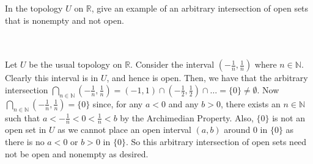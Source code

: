 In the topology $U$ on $\mathbb{R}$, give an example of an arbitrary intersection of open sets that is
nonempty and not open.\\\\

\begin{solution}\renewcommand{\qedsymbol}{}\ \\
    Let $U$ be the usual topology on $\mathbb{R}$. Consider the interval $(-\frac1n, \frac1n)$ where
    $n\in\mathbb{N}$. Clearly this interval is in $U$, and hence is open. Then, we have that the
    arbitrary intersection
    $\bigcap_{n\in\mathbb{N}}(-\frac1n,\frac1n)=(-1,1)\cap(-\frac12,\frac12)\cap\ldots=
    \{0\}\neq\emptyset$.
    Now $\bigcap_{n\in\mathbb{N}}(-\frac1n, \frac1n)=\{0\}$ since, for any $a<0$ and any $b>0$, there
    exists an $n\in\mathbb{N}$ such that $a<-\frac1n<0<\frac1n<b$ by the Archimedian Property. Also,
    $\{0\}$ is not an open set in $U$ as we cannot place an open interval $(a,b)$ around $0$ in $\{0\}$
    as there is no $a<0$ or $b>0$ in $\{0\}$. So this arbitrary intersection of open sets need not be
    open and nonempty as desired.

\end{solution}